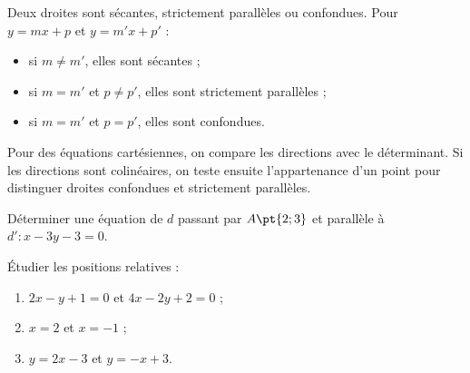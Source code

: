\begin{keypoint}[Propriétés]
Deux droites sont sécantes, strictement parallèles ou confondues. Pour $y=mx+p$ et $y=m'x+p'$ :
\begin{itemize}\item si $m\ne m'$, elles sont sécantes ;\item si $m=m'$ et $p\ne p'$, elles sont strictement parallèles ;\item si $m=m'$ et $p=p'$, elles sont confondues.\end{itemize}
Pour des équations cartésiennes, on compare les directions avec le déterminant. Si les directions sont colinéaires, on teste ensuite l'appartenance d'un point pour distinguer droites confondues et strictement parallèles.
\end{keypoint}
\begin{example}Déterminer une équation de $d$ passant par $A\pt{2;3}$ et parallèle à $d':x-3y-3=0$.\end{example}
\begin{example}Étudier les positions relatives :
\begin{enumerate}\item $2x-y+1=0$ et $4x-2y+2=0$ ;\item $x=2$ et $x=-1$ ;\item $y=2x-3$ et $y=-x+3$.\end{enumerate}\end{example}

